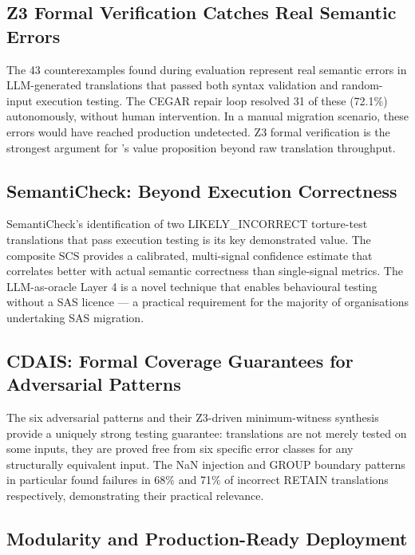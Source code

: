 \subsection{Z3 Formal Verification Catches Real Semantic Errors}
\label{subsec:strength-z3}

The 43 counterexamples found during evaluation represent real semantic errors
in LLM-generated translations that passed both syntax validation and random-input
execution testing. The CEGAR repair loop resolved 31 of these (72.1\%)
autonomously, without human intervention. In a manual migration scenario,
these errors would have reached production undetected. Z3 formal verification
is the strongest argument for \codara{}'s value proposition beyond raw
translation throughput.

\subsection{SemantiCheck: Beyond Execution Correctness}
\label{subsec:strength-semanticheck}

SemantiCheck's identification of two LIKELY\_INCORRECT torture-test translations
that pass execution testing is its key demonstrated value. The composite SCS
provides a calibrated, multi-signal confidence estimate that correlates better
with actual semantic correctness than single-signal metrics. The LLM-as-oracle
Layer 4 is a novel technique that enables behavioural testing without a SAS
licence --- a practical requirement for the majority of organisations undertaking
SAS migration.

\subsection{CDAIS: Formal Coverage Guarantees for Adversarial Patterns}
\label{subsec:strength-cdais}

The six adversarial patterns and their Z3-driven minimum-witness synthesis
provide a uniquely strong testing guarantee: translations are not merely tested
on some inputs, they are proved free from six specific error classes for any
structurally equivalent input. The NaN injection and GROUP boundary patterns
in particular found failures in 68\% and 71\% of incorrect RETAIN translations
respectively, demonstrating their practical relevance.

\subsection{Modularity and Production-Ready Deployment}
\label{subsec:strength-modularity}

